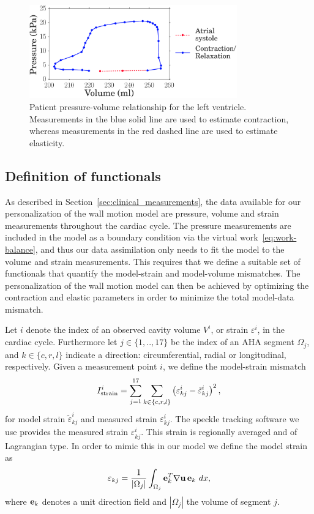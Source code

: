 \begin{figure}[htbp]
\centering
    \includegraphics[width=0.8\textwidth]{patient_pv_loop}
\caption{Patient pressure-volume relationship for the left
  ventricle. Measurements in the blue solid line are used to estimate
  contraction, whereas measurements in the red dashed line are used
  to estimate elasticity. }
\label{fig:pv_loop_phases}
\end{figure}


\subsection{Definition of functionals}
\label{sec:data_func}
As described in Section~\ref{sec:clinical_measurements}, the data
available for our personalization of the wall motion model are
pressure, volume and strain measurements throughout the cardiac
cycle. The pressure measurements are included in the model as a boundary condition 
via the virtual work~\eqref{eq:work-balance},
and thus our data assimilation only needs to fit the model to
the volume and strain measurements. This requires that
we define a suitable set of functionals that quantify the
model-strain and model-volume mismatches. The personalization of the wall motion model can
then be achieved by optimizing the contraction and elastic parameters
in order to minimize the total model-data mismatch.

Let $i$ denote the index of an observed cavity volume $V^i$, or strain
$\varepsilon^i$, in the cardiac cycle. Furthermore let $j \in
\{1,..,17\}$ be the index of an AHA segment $\Omega_j$, and $k \in
\{c,r,l\}$ indicate a direction: circumferential, radial or
longitudinal, respectively. Given a measurement point $i$, we define
the model-strain mismatch
\begin{equation}
 I_{\text{strain}}^i =  \sum_{j= 1}^{17} \sum_{k \in \{c,r,l\}}  \left( \varepsilon_{kj}^i -  \tilde{\varepsilon}_{kj}^i \right)^2,
\label{eq:strain_functional}
 \end{equation}
for model strain $\tilde{\varepsilon}_{kj}^i$ and measured strain
$\varepsilon_{kj}^i$. The speckle tracking software we use provides the measured strain $\varepsilon_{kj}^i$. 
This strain is regionally averaged and of Lagrangian type. In order to mimic this in our model we 
define the model strain as
\begin{equation}
\varepsilon_{kj} =  \frac{1}{|\Omega_j|}\int_{\Omega_j}  \mathbf{e}_k^T \nabla \mathbf{u} \, \mathbf{e}_k \ dx,
\label{eq:g_futhese nctional}
\end{equation}
where $\mathbf{e}_k$ denotes a unit direction field and
$|\Omega_j|$ the volume of segment $j$.

